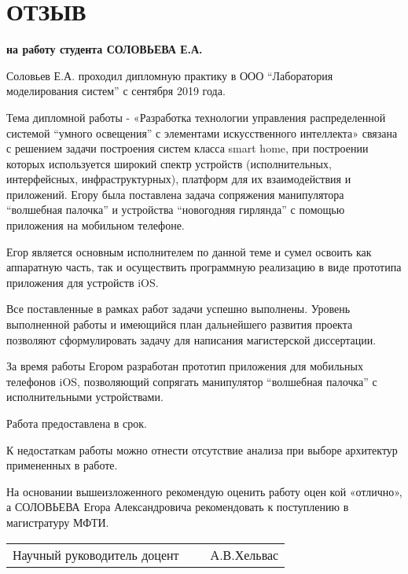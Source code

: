 \pagestyle{empty} %
\chapter{ОТЗЫВ}
\textbf{на работу студента СОЛОВЬЕВА Е.А.}

Соловьев Е.А. проходил дипломную практику в ООО “Лаборатория моделирования систем” с сентября 2019 года.  

Тема дипломной работы - «Разработка технологии управления распределенной системой “умного освещения” с элементами искусственного интеллекта» связана с решением задачи построения систем класса smart home, при построении которых используется широкий спектр устройств (исполнительных, интерфейсных, инфраструктурных), платформ для их взаимодействия и приложений. Егору была поставлена задача сопряжения манипулятора “волшебная палочка” и устройства “новогодняя гирлянда” с помощью приложения на мобильном телефоне. 

Егор является основным исполнителем по данной теме и сумел освоить как аппаратную часть, так и осуществить программную реализацию в виде прототипа приложения для устройств iOS.  

Все поставленные в рамках работ задачи успешно выполнены. Уровень выполненной работы и имеющийся план дальнейшего развития проекта позволяют сформулировать задачу для написания магистерской диссертации.  

За время работы Егором разработан прототип приложения для мобильных телефонов iOS, позволяющий сопрягать манипулятор “волшебная палочка” с исполнительными устройствами.  

Работа предоставлена в срок.  

К недостаткам работы можно отнести отсутствие анализа при выборе архитектур примененных в работе.  

На основании вышеизложенного рекомендую оценить работу оцен кой «отлично», а СОЛОВЬЕВА Егора Александровича рекомендовать к поступлению в магистратуру МФТИ.
	
 \begin{tabular}{p{200pt}p{100pt}p{100pt}} \\[10pt]
        Научный руководитель доцент & &~А.В.Хельвас\\  
    \end{tabular}    